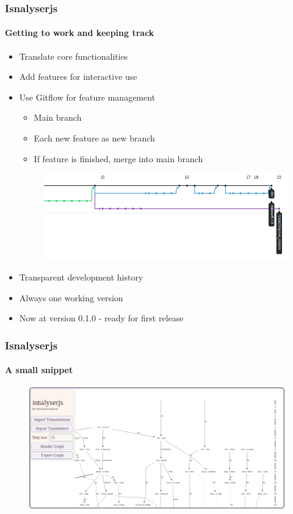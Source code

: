 \documentclass[9pt]{beamer}
\begin{document}
\begin{frame}
\frametitle{Isnalyserjs}
\framesubtitle{Getting to work and keeping track}
\begin{itemize}%
	\item Translate core functionalities
	\item Add features for interactive use
	\pause
	\item Use Gitflow for feature management
	\begin{itemize}
		\item Main branch
		\item Each new feature as new branch
		\item If feature is finished, merge into main branch 
	\end{itemize}
	\begin{figure}
	\flushleft
	\includegraphics[width=.7\linewidth]{figures/git.png}
\end{figure}
\pause
	\item Transparent development history
	\item Always one working version
	\item Now at version 0.1.0 - ready for first release
	
\end{itemize}
\end{frame}



\begin{frame}
\frametitle{Isnalyserjs}
\framesubtitle{A small snippet}
	\begin{figure}
	\flushleft
	\includegraphics[width=1.1\linewidth]{figures/isnalyser_screenshot.pdf}
\end{figure}
\end{frame}
\end{document}
